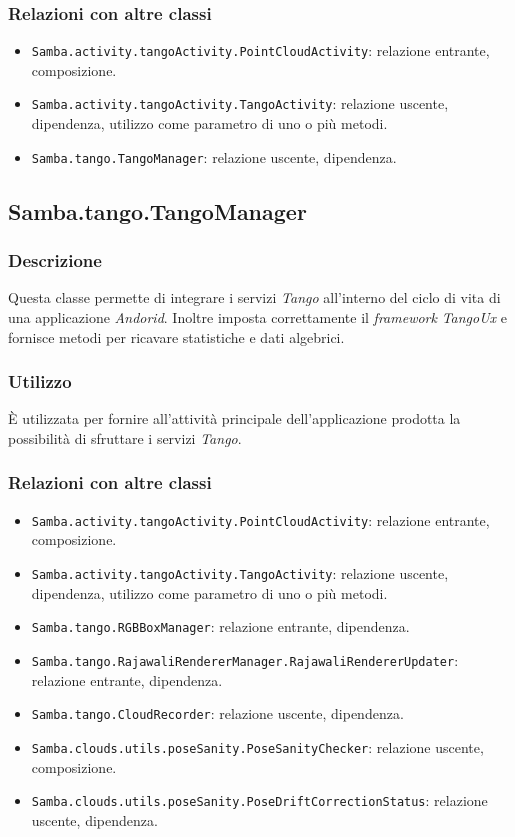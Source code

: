 \subsubsection{Relazioni con altre classi}
\begin{itemize}
	\item \texttt{Samba.activity.tangoActivity.PointCloudActivity}: relazione entrante, composizione.
	\item \texttt{Samba.activity.tangoActivity.TangoActivity}: relazione uscente, dipendenza, utilizzo come parametro di uno o più metodi.
	\item \texttt{Samba.tango.TangoManager}: relazione uscente, dipendenza.
\end{itemize}

\subsection{Samba.tango.TangoManager}
\subsubsection{Descrizione}
Questa classe permette di integrare i servizi \emph{Tango} all'interno del ciclo di vita di una applicazione \emph{Andorid}. Inoltre imposta correttamente il \emph{framework} \emph{TangoUx} e fornisce metodi per ricavare statistiche e dati algebrici.
\subsubsection{Utilizzo}
È utilizzata per fornire all'attività principale dell'applicazione prodotta la possibilità di sfruttare i servizi \emph{Tango}.
\subsubsection{Relazioni con altre classi}
\begin{itemize}
	\item \texttt{Samba.activity.tangoActivity.PointCloudActivity}: relazione entrante, composizione.
	\item \texttt{Samba.activity.tangoActivity.TangoActivity}: relazione uscente, dipendenza, utilizzo come parametro di uno o più metodi.
	\item \texttt{Samba.tango.RGBBoxManager}: relazione entrante, dipendenza.
	\item \texttt{Samba.tango.RajawaliRendererManager.RajawaliRendererUpdater}: relazione entrante, dipendenza.
	\item \texttt{Samba.tango.CloudRecorder}: relazione uscente, dipendenza.
	\item \texttt{Samba.clouds.utils.poseSanity.PoseSanityChecker}: relazione uscente, composizione.
	\item \texttt{Samba.clouds.utils.poseSanity.PoseDriftCorrectionStatus}: relazione uscente, dipendenza.
\end{itemize}

